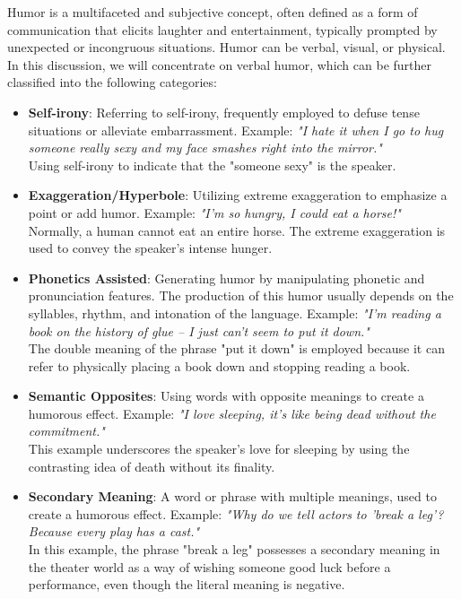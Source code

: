 \documentclass[a4paper]{article}
\begin{document}
Humor is a multifaceted and subjective concept, often defined as a form of communication that elicits laughter and entertainment, typically prompted by unexpected or incongruous situations. 
Humor can be verbal, visual, or physical. In this discussion, we will concentrate on verbal humor, which can be further classified into the following categories:\cite{ref_concept1}

\begin{itemize}
    \item {\bf Self-irony}: Referring to self-irony, frequently employed to defuse tense situations or alleviate embarrassment. Example:
        \subitem\textit{"I hate it when I go to hug someone really sexy and my face smashes right into the mirror."}
        \\Using self-irony to indicate that the "someone sexy" is the speaker.
    \item {\bf Exaggeration/Hyperbole}: Utilizing extreme exaggeration to emphasize a point or add humor. Example:
        \subitem\textit{"I'm so hungry, I could eat a horse!"}
        \\Normally, a human cannot eat an entire horse. The extreme exaggeration is used to convey the speaker's intense hunger.
    \item {\bf Phonetics Assisted}: Generating humor by manipulating phonetic and pronunciation features. The production of this humor usually depends on the syllables, rhythm, and intonation of the language. Example:
        \subitem\textit{"I'm reading a book on the history of glue – I just can't seem to put it down."}
        \\The double meaning of the phrase "put it down" is employed because it can refer to physically placing a book down and stopping reading a book.
    \item {\bf Semantic Opposites}: Using words with opposite meanings to create a humorous effect. Example:
        \subitem\textit{"I love sleeping, it's like being dead without the commitment."}
        \\This example underscores the speaker's love for sleeping by using the contrasting idea of death without its finality.
    \item {\bf Secondary Meaning}: A word or phrase with multiple meanings, used to create a humorous effect. Example:
        \subitem\textit{"Why do we tell actors to 'break a leg'? Because every play has a cast."}
        \\In this example, the phrase "break a leg" possesses a secondary meaning in the theater world as a way of wishing someone good luck before a performance, even though the literal meaning is negative.
\end{itemize}
\end{document}

